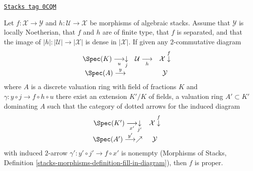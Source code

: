 \begin{lemma}
\label{stacks-more-morphisms-lemma-refined-valuative-criterion-proper}
\href{https://stacks.math.columbia.edu/tag/0CQM}{\texttt{Stacks tag 0CQM}}

Let $f : \mathcal{X} \to \mathcal{Y}$ and $h : \mathcal{U} \to \mathcal{X}$
be morphisms of algebraic stacks. Assume that $\mathcal{Y}$ is
locally Noetherian, that $f$ and $h$ are of finite type,
that $f$ is separated, and that the image of
$|h| : |\mathcal{U}| \to |\mathcal{X}|$ is dense in $|\mathcal{X}|$.
If given any $2$-commutative diagram
$$
\begin{array}{ccc}\Spec(K) \underset{u}{\longrightarrow}\underset{j}{\downarrow} & \mathcal{U} \underset{h}{\longrightarrow} & \mathcal{X} \overset{f}{\downarrow} \\ \Spec(A) \overset{y}{\longrightarrow} &  & \mathcal{Y}\end{array}
$$
where $A$ is a discrete valuation ring with field of fractions $K$
and $\gamma : y \circ j \to f \circ h \circ u$ there
exist an extension $K'/K$ of fields, a valuation ring $A' \subset K'$
dominating $A$ such that the category of dotted arrows for the
induced diagram
$$
\begin{array}{cc}\Spec(K') \underset{x'}{\longrightarrow}\underset{j'}{\downarrow} & \mathcal{X} \overset{f}{\downarrow} \\ \Spec(A') \overset{y'}{\longrightarrow}\nearrow & \mathcal{Y}\end{array}
$$
with induced $2$-arrow $\gamma' : y' \circ j' \to f \circ x'$
is nonempty (Morphisms of Stacks, Definition
\ref{stacks-morphisms-definition-fill-in-diagram}), then $f$ is proper.
\end{lemma}

